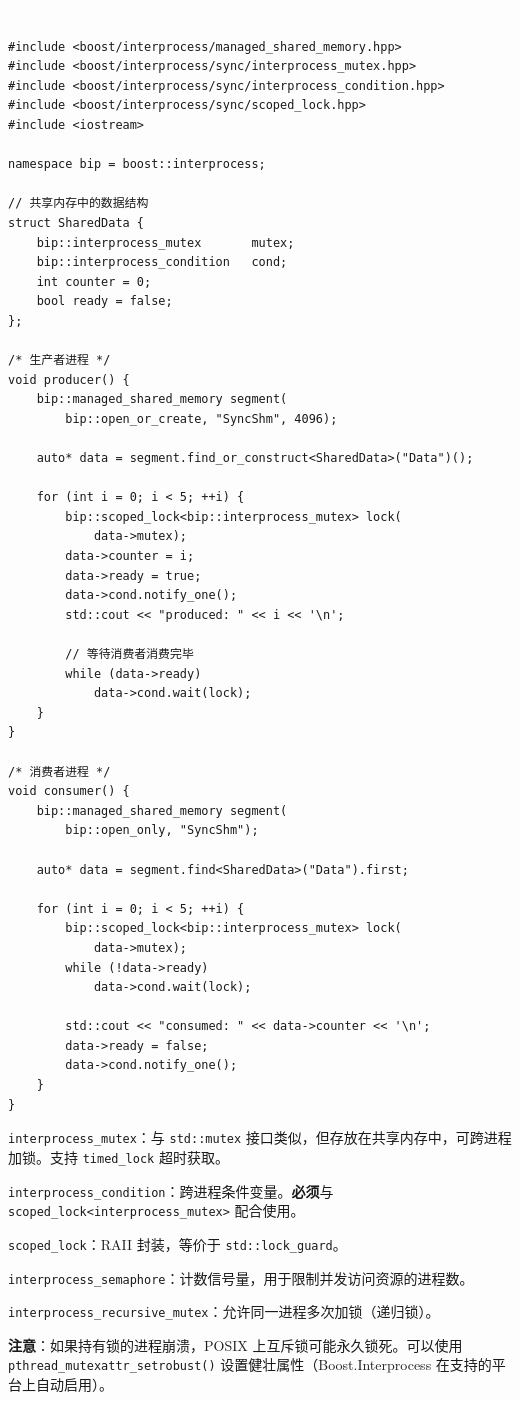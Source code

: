 \documentclass[12pt,a4paper,fontset=fandol]{ctexbook}
\newcommand{\Fn}[1]{\texttt{#1()}}
\newcommand{\Tp}[1]{\texttt{#1}}
\newcommand{\cpplabel}{%
  \noindent\begin{tcolorbox}[sharp corners,colback=algheadbg,colframe=algheadbg,
    left=6pt,right=6pt,top=2pt,bottom=2pt,boxrule=0pt]
  \textcolor{white}{\small\bfseries\sffamily C++}\end{tcolorbox}%
}
\begin{document}
\cpplabel
\begin{lstlisting}
#include <boost/interprocess/managed_shared_memory.hpp>
#include <boost/interprocess/sync/interprocess_mutex.hpp>
#include <boost/interprocess/sync/interprocess_condition.hpp>
#include <boost/interprocess/sync/scoped_lock.hpp>
#include <iostream>

namespace bip = boost::interprocess;

// 共享内存中的数据结构
struct SharedData {
    bip::interprocess_mutex       mutex;
    bip::interprocess_condition   cond;
    int counter = 0;
    bool ready = false;
};

/* 生产者进程 */
void producer() {
    bip::managed_shared_memory segment(
        bip::open_or_create, "SyncShm", 4096);

    auto* data = segment.find_or_construct<SharedData>("Data")();

    for (int i = 0; i < 5; ++i) {
        bip::scoped_lock<bip::interprocess_mutex> lock(
            data->mutex);
        data->counter = i;
        data->ready = true;
        data->cond.notify_one();
        std::cout << "produced: " << i << '\n';

        // 等待消费者消费完毕
        while (data->ready)
            data->cond.wait(lock);
    }
}

/* 消费者进程 */
void consumer() {
    bip::managed_shared_memory segment(
        bip::open_only, "SyncShm");

    auto* data = segment.find<SharedData>("Data").first;

    for (int i = 0; i < 5; ++i) {
        bip::scoped_lock<bip::interprocess_mutex> lock(
            data->mutex);
        while (!data->ready)
            data->cond.wait(lock);

        std::cout << "consumed: " << data->counter << '\n';
        data->ready = false;
        data->cond.notify_one();
    }
}
\end{lstlisting}

\begin{guideline}[title=Boost.Interprocess 同步原语要点]
\Tp{interprocess\_mutex}：与 \Tp{std::mutex} 接口类似，但存放在共享内存中，可跨进程加锁。支持 \Tp{timed\_lock} 超时获取。

\Tp{interprocess\_\allowbreak{}condition}：跨进程条件变量。\textbf{必须}与 \Tp{scoped\_\allowbreak{}lock<interprocess\_\allowbreak{}mutex>} 配合使用。

\Tp{scoped\_lock}：RAII 封装，等价于 \Tp{std::lock\_guard}。

\Tp{interprocess\_semaphore}：计数信号量，用于限制并发访问资源的进程数。

\Tp{interprocess\_recursive\_mutex}：允许同一进程多次加锁（递归锁）。

\textbf{注意}：如果持有锁的进程崩溃，POSIX 上互斥锁可能永久锁死。可以使用 \Fn{pthread\_mutexattr\_setrobust} 设置健壮属性（Boost.Interprocess 在支持的平台上自动启用）。
\end{guideline}
\end{document}
